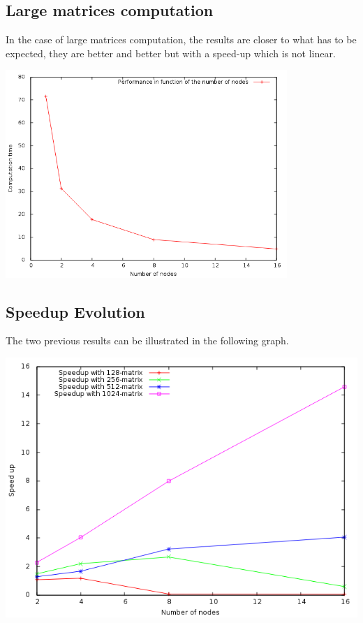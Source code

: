 \documentclass[a4paper,11pt]{article}
\begin{document}
\subsection{Large matrices computation}

In the case of large matrices computation, the results are closer to what
has to be expected, they are better and better but with a speed-up which is
not linear.

\begin{center}
  \includegraphics[width=0.8\textwidth]{./1024perf.png}
\end{center}

\subsection{Speedup Evolution}

The two previous results can be illustrated in the following graph.

\begin{center}
  \includegraphics[width=\textwidth]{./speedup.png}
\end{center}
\end{document}
